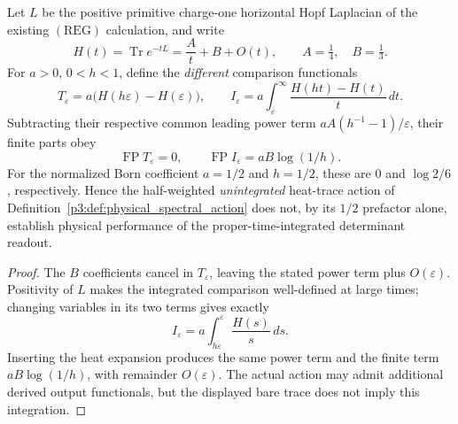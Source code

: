 \documentclass[12pt,a4paper]{article}
\begin{document}
\begin{proposition}
\label{p3c:prop:v1188-heat-determinant-distinction}
Let $L$ be the positive primitive charge-one horizontal Hopf
Laplacian of the existing $(\mathrm{REG})$ calculation, and write
\[
 H(t)=\operatorname{Tr}e^{-tL}=\frac{A}{t}+B+O(t),
 \qquad A=\tfrac14,\quad B=\tfrac13.
\]
For $a>0$, $0<h<1$, define the \emph{different} comparison
functionals
\[
 T_\varepsilon=a\bigl(H(h\varepsilon)-H(\varepsilon)\bigr),
 \qquad
 I_\varepsilon=a\int_\varepsilon^\infty
         \frac{H(ht)-H(t)}{t}\,dt .
\]
Subtracting their respective common leading power term
$aA(h^{-1}-1)/\varepsilon$, their finite parts obey
\[
 \boxed{\operatorname{FP}T_\varepsilon=0},\qquad
 \boxed{\operatorname{FP}I_\varepsilon=aB\log(1/h)}.
\]
For the normalized Born coefficient $a=1/2$ and $h=1/2$,
these are $0$ and $\log2/6$, respectively.  Hence the
half-weighted \emph{unintegrated} heat-trace action of
Definition~\ref{p3:def:physical_spectral_action} does not, by
its $1/2$ prefactor alone, establish physical performance of the
proper-time-integrated determinant readout.
\end{proposition}
\begin{proof}
The $B$ coefficients cancel in $T_\varepsilon$, leaving the
stated power term plus $O(\varepsilon)$.  Positivity of $L$ makes
the integrated comparison well-defined at large times; changing
variables in its two terms gives exactly
\[
  I_\varepsilon=a\int_{h\varepsilon}^\varepsilon\frac{H(s)}s\,ds.
\]
Inserting the heat expansion produces the same power term and
the finite term $aB\log(1/h)$, with remainder $O(\varepsilon)$.
The actual action may admit additional derived output functionals,
but the displayed bare trace does not imply this integration.
\end{proof}
\end{document}
